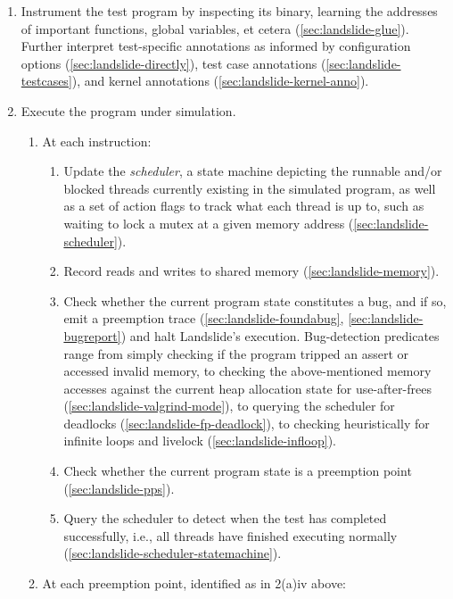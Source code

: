 {\begin{enumerate}
	\item Instrument the test program by inspecting its binary,
		learning the addresses of important functions, global variables, et cetera
		(\cref{sec:landslide-glue}).
		Further interpret test-specific annotations
		as informed by
		configuration options (\cref{sec:landslide-directly}),
		test case annotations (\cref{sec:landslide-testcases}),
		and
		kernel annotations (\cref{sec:landslide-kernel-anno}).
	\item Execute the program under simulation.
		\begin{enumerate}
			\item At each instruction:
				\begin{enumerate}
					\item Update the {\em scheduler},
						a state machine depicting the runnable and/or blocked
						threads currently existing in the simulated program,
						as well as a set of action flags to track what each thread is up to,
						such as waiting to lock a mutex at a given memory address
						(\cref{sec:landslide-scheduler}).
					\item Record reads and writes to shared memory (\cref{sec:landslide-memory}).
					\item Check whether the current program state constitutes a bug,
						and if so,
						emit a preemption trace
						(\cref{sec:landslide-foundabug}, \cref{sec:landslide-bugreport})
						and halt Landslide's execution.
						Bug-detection predicates range from
						simply checking if the program tripped an assert
						or accessed invalid memory,
						to checking the above-mentioned memory accesses against the current
						heap allocation state for use-after-frees (\cref{sec:landslide-valgrind-mode}),
						to querying the scheduler for deadlocks (\cref{sec:landslide-fp-deadlock}),
						to checking heuristically for infinite loops and livelock
						(\cref{sec:landslide-infloop}).
					\item Check whether the current program state is a preemption point
						(\cref{sec:landslide-pps}).
					\item Query the scheduler to detect when the test has completed successfully,
						i.e., all threads have finished executing normally
						(\cref{sec:landslide-scheduler-statemachine}).
				\end{enumerate}
			\item At each preemption point, identified as in 2(a)iv above:
				\begin{enumerate}

\end{enumerate}
\end{enumerate}
\end{enumerate}}
